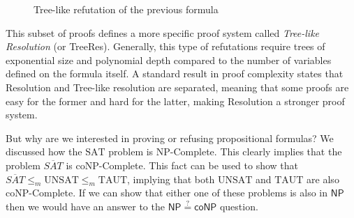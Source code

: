 \begin{figure}[H]
    \centering
    
    
    \caption{Tree-like refutation of the previous formula}
\end{figure}

This subset of proofs defines a more specific proof system called \textit{Tree-like Resolution} (or \textsf{TreeRes}). Generally, this type of refutations require trees of exponential size and polynomial depth compared to the number of variables defined on the formula itself. A standard result in proof complexity states that Resolution and Tree-like resolution are separated, meaning that some proofs are easy for the former and hard for the latter, making Resolution a stronger proof system.

But why are we interested in proving or refusing propositional formulas? We discussed how the $\mathrm{SAT}$ problem is \textsf{NP}-Complete. This clearly implies that the problem $\overline{SAT}$ is \textsf{coNP}-Complete. This fact can be used to show that $\overline{SAT} \leq_m \mathrm{UNSAT} \leq_m \mathrm{TAUT}$, implying that both $\mathrm{UNSAT}$ and $\mathrm{TAUT}$ are also \textsf{coNP}-Complete. If we can show that either one of these problems is also in $\mathsf{NP}$ then we would have an answer to the $\mathsf{NP} \stackrel{?}{=} \mathsf{coNP}$ question.

